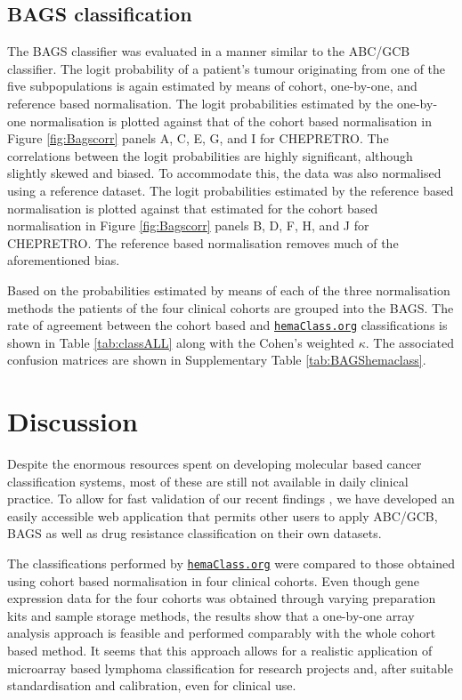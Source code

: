 \documentclass[twocolumn]{bmcart}%
\newcommand{\hemaClass}{\href{http://hemaClass.org}{\texttt{hemaClass.org}}}
\begin{document}
\subsection{BAGS classification}
The BAGS classifier was evaluated in a manner similar to the ABC/GCB classifier.
The logit probability of a patient's tumour originating from one of the five subpopulations is again estimated by means of cohort, one-by-one, and reference based normalisation.
The logit probabilities estimated by the one-by-one normalisation is plotted against that of the cohort based normalisation in Figure \ref{fig:Bagscorr} panels A, C, E, G, and I for CHEPRETRO.
The correlations between the logit probabilities are highly significant, although slightly skewed and biased.
To accommodate this, the data was also normalised using a reference dataset.
The logit probabilities estimated by the reference based normalisation is plotted against that estimated for the cohort based normalisation in Figure \ref{fig:Bagscorr} panels B, D, F, H, and J for CHEPRETRO.
The reference based normalisation removes much of the aforementioned bias.

Based on the probabilities estimated by means of each of the three normalisation methods the patients of the four clinical cohorts are grouped into the BAGS.
The rate of agreement between the cohort based and \hemaClass{} classifications is shown in Table \ref{tab:classALL} along with the Cohen's weighted $\kappa$.
The associated confusion matrices are shown in Supplementary Table \ref{tab:BAGShemaclass}.




\section{Discussion}
Despite the enormous resources spent on developing molecular based cancer classification systems,
most of these are still not available in daily clinical practice.
To allow for fast validation of our recent findings \cite{DybkaerBoegsted2015, Falgreen2015}, we have developed an easily accessible web application that permits other users to apply ABC/GCB, BAGS as well as drug resistance classification on their own datasets.

The classifications performed by \hemaClass{} were compared to those obtained using cohort based normalisation in four clinical cohorts.
Even though gene expression data for the four cohorts was obtained through varying preparation kits and sample storage methods, the results show that a one-by-one array analysis approach is feasible and performed comparably with the whole cohort based method.
It seems that this approach allows for a realistic application of microarray based lymphoma classification for research projects and, after suitable standardisation and calibration, even for clinical use.
\end{document}
